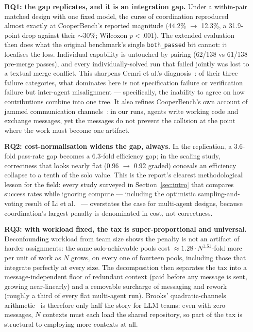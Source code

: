 \documentclass[11pt,a4paper]{article}
\begin{document}
\textbf{RQ1: the gap replicates, and it is an integration gap.} Under a within-pair matched design with one fixed model, the curse of coordination reproduced almost exactly at CooperBench's reported magnitude (44.2\% $\rightarrow$ 12.3\%, a 31.9-point drop against their ${\sim}30\%$; Wilcoxon $p < .001$). The extended evaluation then does what the original benchmark's single \texttt{both\_passed} bit cannot: it localises the loss. Individual capability is untouched by pairing (62/138 vs 61/138 pre-merge passes), and every individually-solved run that failed jointly was lost to a textual merge conflict. This sharpens Cemri et al.'s diagnosis~\cite{cemri2025why}: of their three failure categories, what dominates here is not specification failure or verification failure but inter-agent misalignment --- specifically, the inability to agree on how contributions combine into one tree. It also refines CooperBench's own account of jammed communication channels~\cite{khatua2026cooperbench}: in our runs, agents write working code and exchange messages, yet the messages do not prevent the collision at the point where the work must become one artifact.

\textbf{RQ2: cost-normalisation widens the gap, always.} In the replication, a 3.6-fold pass-rate gap becomes a 6.3-fold efficiency gap; in the scaling study, correctness that looks nearly flat (0.96 $\rightarrow$ 0.92 graded) conceals an efficiency collapse to a tenth of the solo value. This is the report's clearest methodological lesson for the field: every study surveyed in Section~\ref{sec:intro} that compares success rates while ignoring compute --- including the optimistic sampling-and-voting result of Li et al.~\cite{li2024moreagents} --- overstates the case for multi-agent designs, because coordination's largest penalty is denominated in cost, not correctness.

\textbf{RQ3: with workload fixed, the tax is super-proportional and universal.} Deconfounding workload from team size shows the penalty is not an artifact of harder assignments: the same solo-achievable pools cost $\approx 1.28 \cdot N^{1.61}$-fold more per unit of work as $N$ grows, on every one of fourteen pools, including those that integrate perfectly at every size. The decomposition then separates the tax into a message-independent floor of redundant context (paid before any message is sent, growing near-linearly) and a removable surcharge of messaging and rework (roughly a third of every flat multi-agent run). Brooks' quadratic-channels arithmetic~\cite{brooks1975mythical} is therefore only half the story for LLM teams: even with zero messages, $N$ contexts must each load the shared repository, so part of the tax is structural to employing more contexts at all.
\end{document}
